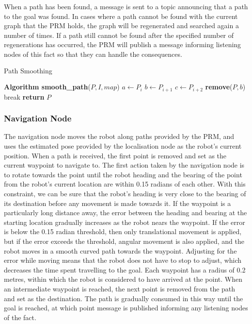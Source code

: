 \documentclass[conference]{IEEEtran}
\begin{document}
When a path has been found, a message is sent to a topic announcing that a path to the goal was found. In cases where a path cannot be found with the current graph that the PRM holds, the graph will be regenerated and searched again a number of times. If a path still cannot be found after the specified number of regenerations has occurred, the PRM will publish a message informing listening nodes of this fact so that they can handle the consequences.

\begin{algorithm}
  \caption{Path Smoothing}
  \label{alg:pathsmooth}
  \begin{algorithmic}[1]
    \State \textbf{Algorithm smooth\_path}\textnormal{($P, I, map$)}
    \State $a \gets P_i$
    \State $b \gets P_{i+1}$
    \State $c \gets P_{i+2}$
    \State \textbf{remove}($P,b$)
    \EndIf
    \EndFor
    \State break
    \EndIf
    \EndFor
    \State \textbf{return}\textnormal{ $P$}
  \end{algorithmic}
\end{algorithm}

\subsubsection{Navigation Node}
The navigation node moves the robot along paths provided by the PRM, and uses the estimated pose provided by the localisation node as the robot's current position. When a path is received, the first point is removed and set as the current waypoint to navigate to. The first action taken by the navigation node is to rotate towards the point until the robot heading and the bearing of the point from the robot's current location are within 0.15 radians of each other. With this constraint, we can be sure that the robot's heading is very close to the bearing of its destination before any movement is made towards it. If the waypoint is a particularly long distance away, the error between the heading and bearing at the starting location gradually increases as the robot nears the waypoint. If the error is below the 0.15 radian threshold, then only translational movement is applied, but if the error exceeds the threshold, angular movement is also applied, and the robot moves in a smooth curved path towards the waypoint. Adjusting for the error while moving means that the robot does not have to stop to adjust, which decreases the time spent travelling to the goal. Each waypoint has a radius of 0.2 metres, within which the robot is considered to have arrived at the point. When an intermediate waypoint is reached, the next point is removed from the path and set as the destination. The path is gradually consumed in this way until the goal is reached, at which point message is published informing any listening nodes of the fact.
\end{document}
